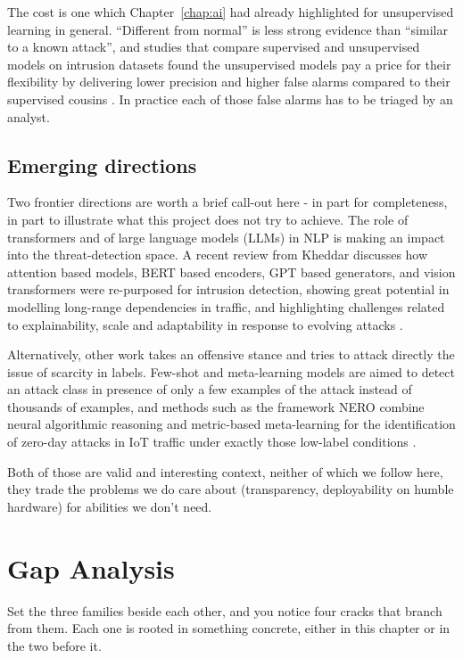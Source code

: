 The cost is one which Chapter~\ref{chap:ai} had already highlighted for unsupervised learning in general. “Different from normal” is less strong evidence than “similar to a known attack”, and studies that compare supervised and unsupervised models on intrusion datasets found the unsupervised models pay a price for their flexibility by delivering lower precision and higher false alarms compared to their supervised cousins \cite{khoei2023comparative}. In practice each of those false alarms has to be triaged by an analyst.

\subsection{Emerging directions}
\label{sec:ids_emerging}

Two frontier directions are worth a brief call-out here - in part for completeness, in part to illustrate what this project does not try to achieve. The role of transformers and of large language models (LLMs) in NLP is making an impact into the threat-detection space. A recent review from Kheddar discusses how attention based models, BERT based encoders, GPT based generators, and vision transformers were re-purposed for intrusion detection, showing great potential in modelling long-range dependencies in traffic, and highlighting challenges related to explainability, scale and adaptability in response to evolving attacks \cite{kheddar2025transformers}.

Alternatively, other work takes an offensive stance and tries to attack directly the issue of scarcity in labels. Few-shot and meta-learning models are aimed to detect an attack class in presence of only a few examples of the attack instead of thousands of examples, and methods such as the framework NERO combine neural algorithmic reasoning and metric-based meta-learning for the identification of zero-day attacks in IoT traffic under exactly those low-label conditions \cite{cevallos2024nero}.

Both of those are valid and interesting context, neither of which we follow here, they trade the problems we do care about (transparency, deployability on humble hardware) for abilities we don't need.
\section{Gap Analysis}
\label{sec:ids_gaps}

Set the three families beside each other, and you notice four cracks that branch from them. Each one is rooted in something concrete, either in this chapter or in the two before it.

